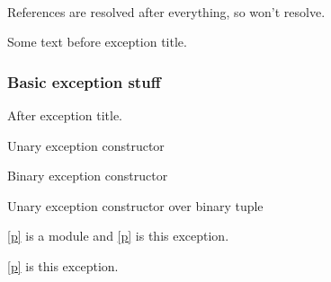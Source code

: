 \label{Ocamlary-module-Buffer}\begin{ocamlindent}\label{Ocamlary-Buffer-val-f}\\
\end{ocamlindent}%
\begin{ocamlindent}References are resolved after everything, so  won't resolve.\end{ocamlindent}%
\medbreak
Some text before exception title.

\subsubsection{Basic exception stuff\label{basic-exception-stuff}}%
After exception title.

\label{Ocamlary-exception-Kaboom}\begin{ocamlindent}Unary exception constructor\end{ocamlindent}%
\medbreak
\label{Ocamlary-exception-Kablam}\begin{ocamlindent}Binary exception constructor\end{ocamlindent}%
\medbreak
\label{Ocamlary-exception-Kapow}\begin{ocamlindent}Unary exception constructor over binary tuple\end{ocamlindent}%
\medbreak
\label{Ocamlary-exception-EmptySig}\begin{ocamlindent}\hyperref[Ocamlary-module-type-EmptySig]{[p\pageref*{Ocamlary-module-type-EmptySig}]} is a module and \hyperref[Ocamlary-exception-EmptySig]{[p\pageref*{Ocamlary-exception-EmptySig}]} is this exception.\end{ocamlindent}%
\medbreak
\label{Ocamlary-exception-EmptySigAlias}\begin{ocamlindent}\hyperref[Ocamlary-exception-EmptySigAlias]{[p\pageref*{Ocamlary-exception-EmptySigAlias}]} is this exception.\end{ocamlindent}%
\medbreak
